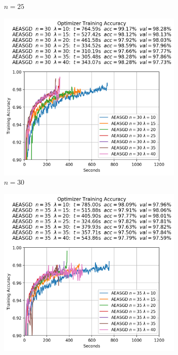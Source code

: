 \begin{figure}
\begin{subfigure}{.3\textwidth}
    \caption{$n = 25$}
  \end{subfigure}
  \begin{subfigure}{.3\textwidth}
    \centering
    \includegraphics[width=\linewidth]{resources/images/aeasgd_experiments_workers_30}
    \caption{$n = 30$}
  \end{subfigure}
  \begin{subfigure}{.3\textwidth}
    \centering
    \includegraphics[width=\linewidth]{resources/images/aeasgd_experiments_workers_35}

\end{subfigure}
\end{figure}
